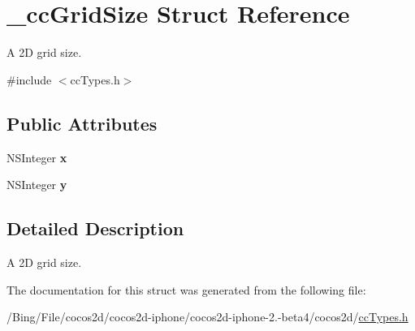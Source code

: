 \hypertarget{struct__cc_grid_size}{\section{\-\_\-cc\-Grid\-Size Struct Reference}
\label{struct__cc_grid_size}
}


A 2\-D grid size.  




{\ttfamily \#include $<$cc\-Types.\-h$>$}

\subsection*{Public Attributes}
\begin{DoxyCompactItemize}
\item 
\hypertarget{struct__cc_grid_size_a8f99586c7c09c841be4a558505d260f6}{N\-S\-Integer {\bfseries x}}\label{struct__cc_grid_size_a8f99586c7c09c841be4a558505d260f6}

\item 
\hypertarget{struct__cc_grid_size_a71f35e7ceb93c234e24c34b647447f62}{N\-S\-Integer {\bfseries y}}\label{struct__cc_grid_size_a71f35e7ceb93c234e24c34b647447f62}

\end{DoxyCompactItemize}


\subsection{Detailed Description}
A 2\-D grid size. 

The documentation for this struct was generated from the following file\-:\begin{DoxyCompactItemize}
\item 
/\-Bing/\-File/cocos2d/cocos2d-\/iphone/cocos2d-\/iphone-\/2.-\/beta4/cocos2d/\hyperlink{cc_types_8h}{cc\-Types.\-h}\end{DoxyCompactItemize}
